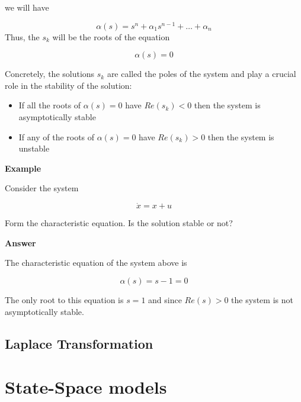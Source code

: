 we will have

\begin{equation}
\alpha(s) = s^n +\alpha_{1}s^{n-1} + \dots + \alpha_n   
\label{linear_sys_charact_pol}
\end{equation}
Thus, the $s_k$ will be the roots of the equation


\begin{equation}
\alpha(s) = 0 
\label{linear_sys_charact_pol_eq}
\end{equation}

Concretely, the solutions $s_k$ are called the poles of the system and play a crucial role in the stability of the solution:

\begin{itemize}
\item If all the roots of $\alpha(s)=0$ have $Re(s_k) < 0 $ then the system is asymptotically stable
\item If any of the roots of $\alpha(s)=0$ have $Re(s_k) > 0 $ then the system is  unstable
\end{itemize}

\begin{framed}
\label{linear_sys_exe_1}

\textbf{Example}

Consider the system

\begin{equation}
\dot{x} = x +u \nonumber
\end{equation}

Form the characteristic equation. Is the solution stable or not?

\textbf{Answer}

The characteristic equation of the system above is

\begin{equation}
\alpha(s) = s -1 =0 \nonumber
\end{equation}

The only root to this equation is $s=1$ and since $Re(s) > 0$ the system is not asymptotically stable.

\end{framed}



\subsection{Laplace Transformation}


\section{State-Space models}

